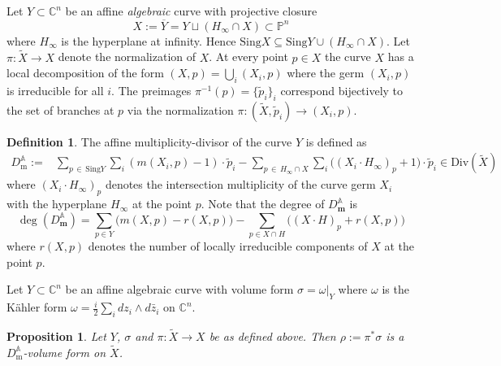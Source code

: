 \documentclass[11pt]{amsart}
\newtheorem{prop}[theorem]{Proposition}
\theoremstyle{definition}
\newtheorem{definition}[theorem]{Definition}
\newcommand{\bC}{{\mathbb C}}
\begin{document}
Let $Y \subset \bC^n$ be an affine \textit{algebraic} curve with projective closure
$$X:=\overline{Y} = Y \sqcup (H_\infty\cap X) \subset \mathbb{P}^n$$
where $H_\infty$ is the hyperplane at infinity. Hence $\text{Sing}X \subseteq \text{Sing}Y \cup (H_\infty \cap X)$. Let $\pi : \widetilde{X} \to X$ denote the normalization of $X$. At every point $p\in X$ the curve $X$ has a local decomposition of the form $(X,p) = \bigcup_i(X_i,p)$ where the germ $(X_i,p)$ is irreducible for all $i$. The preimages $\pi^{-1}(p) = \{\tilde{p}_i\}_i$ correspond bijectively to the set of branches at $p$ via the normalization $\pi:(\widetilde{X},\tilde{p}_i) \to (X_i,p)$.



\begin{definition}\label{def:affmultdiv}
   The affine multiplicity-divisor of the curve $Y$ is defined as
\begin{align*}
    D^{\mathbb{A}}_\text{m} :=& \sum_{p\,\in \,\text{Sing}Y} \sum_i (m(X_i,p)-1)\cdot \tilde{p}_{i}  -\sum_{p \, \in \, H_\infty \cap X} \sum_i \big((X_i\cdot H_\infty)_{p}+1\big)\cdot \tilde{p}_{i}\in \text{Div}(\widetilde{X})
\end{align*}
   where $(X_i\cdot H_\infty)_{p}$ denotes the intersection multiplicity of the curve germ $X_i$ with the hyperplane $H_\infty$ at the point $p$. Note that the degree of $D_\mathbf{m}^\mathbb{A}$ is
   $$\deg(D_\mathbf{m}^\mathbb{A}) = \sum_{p\in Y}\big(m(X,p)-r(X,p)\big)-\sum_{p \in X \cap H}\big((X\cdot H)_p + r(X,p) \big)$$
   where $r(X,p)$ denotes the number of locally irreducible components of $X$ at the point $p$.
\end{definition}



Let $Y \subset \bC^n$ be an affine algebraic curve with volume form $\sigma = \left.\omega\right|_Y$ where $\omega$ is the K\"ahler form $\omega = \frac{i}{2}\sum_idz_i \wedge d\bar{z}_i$ on $\bC^n$.

\begin{prop}
    Let $Y$, $\sigma$ and $\pi : \widetilde{X}\to X$ be as defined above. Then $\rho := \pi^*\sigma$ is a $D_\text{m}^\mathbb{A}$-volume form on $\widetilde{X}$.
\end{prop}
\end{document}
